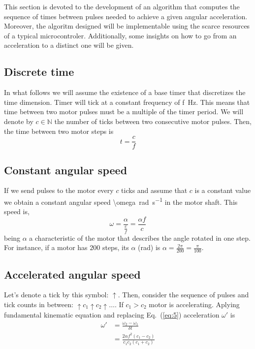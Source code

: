 \documentclass[a4paper]{article}
\newcommand{\vSI}[2]{\SI[math-rm=\ensuremath,parse-numbers=false]{#1}{#2}}
\begin{document}
This section is devoted to the development of an algorithm that
computes the sequence of times between pulses needed to achieve a
given angular acceleration. Moreover, the algoritm designed will be
implementable using the scarce resources of a typical
microcontroler. Additionally, some insights on how to go from an
acceleration to a distinct one will be given.


\subsection{Discrete time}

In what follows we will assume the existence of a base timer that
discretizes the time dimension. Timer will tick at a constant
frequency of \vSI{f}{\hertz}. This means that time between two motor
pulses must be a multiple of the timer period. We will denote by
$c\in\mathbb{N}$ the number of ticks between two consecutive motor
pulses. Then, the time between two motor steps is
\begin{equation}
  \label{eq:4}
  t = \frac{c}{f}  
\end{equation}

\subsection{Constant angular speed}

If we send pulses to the motor every $c$ ticks and assume that $c$ is
a constant value we obtain a constant angular speed
\vSI{\omega}{\radian\per\second} in the motor shaft. This speed is,
\begin{equation}
  \label{eq:5}
  \omega = \frac{\alpha}{\frac{c}{f}} = \frac{\alpha f}{c}  
\end{equation}
being $\alpha$ a characteristic of the motor that describes the angle
rotated in one step. For instance, if a motor has $200$ steps, its
$\alpha$ (\si{\radian}) is
$\alpha = \frac{2\pi}{200} = \frac{\pi}{100}$.


\subsection{Accelerated angular speed}

Let's denote a tick by this symbol: $\uparrow$. Then, consider the
sequence of pulses and tick counts in between:
$\uparrow c_1\uparrow c_2\uparrow\dots$. If $c_1 > c_2$ motor is
accelerating. Aplying fundamental kinematic equation and replacing
Eq.~(\ref{eq:5}) acceleration $\omega'$ is
\begin{equation}
  \label{eq:6}
  \begin{split}
    \omega' & = \frac{\omega_2-\omega_1}{\delta t} \\
            & = \frac{2\alpha f^2(c_1-c_2)}{c_1 c_2 (c_1 + c_2)}
\end{split}
\end{equation}
\end{document}
